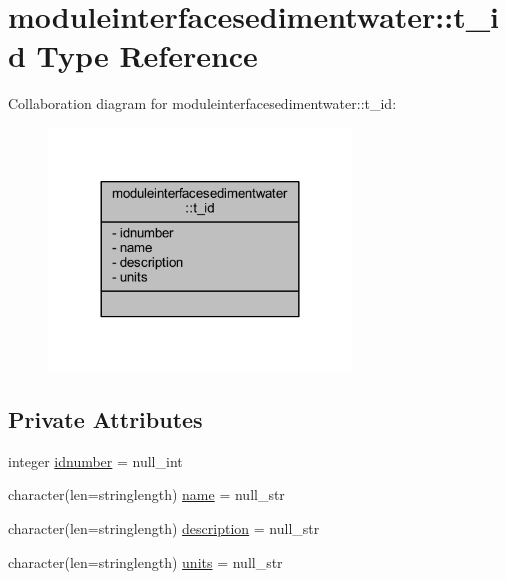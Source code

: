 \hypertarget{structmoduleinterfacesedimentwater_1_1t__id}{}\section{moduleinterfacesedimentwater\+:\+:t\+\_\+id Type Reference}
\label{structmoduleinterfacesedimentwater_1_1t__id}


Collaboration diagram for moduleinterfacesedimentwater\+:\+:t\+\_\+id\+:\nopagebreak
\begin{figure}[H]
\begin{center}
\leavevmode
\includegraphics[width=228pt]{structmoduleinterfacesedimentwater_1_1t__id__coll__graph}
\end{center}
\end{figure}
\subsection*{Private Attributes}
\begin{DoxyCompactItemize}
\item 
integer \mbox{\hyperlink{structmoduleinterfacesedimentwater_1_1t__id_a2a33911a5884f672333f02d9a6a7ea6c}{idnumber}} = null\+\_\+int
\item 
character(len=stringlength) \mbox{\hyperlink{structmoduleinterfacesedimentwater_1_1t__id_ae6f25debee25aee465f6150518d9968b}{name}} = null\+\_\+str
\item 
character(len=stringlength) \mbox{\hyperlink{structmoduleinterfacesedimentwater_1_1t__id_ad2adefb16b08996846e5fce19a10ac84}{description}} = null\+\_\+str
\item 
character(len=stringlength) \mbox{\hyperlink{structmoduleinterfacesedimentwater_1_1t__id_a2a3204affa0f89c8787d9a6c7e8b7256}{units}} = null\+\_\+str
\end{DoxyCompactItemize}


